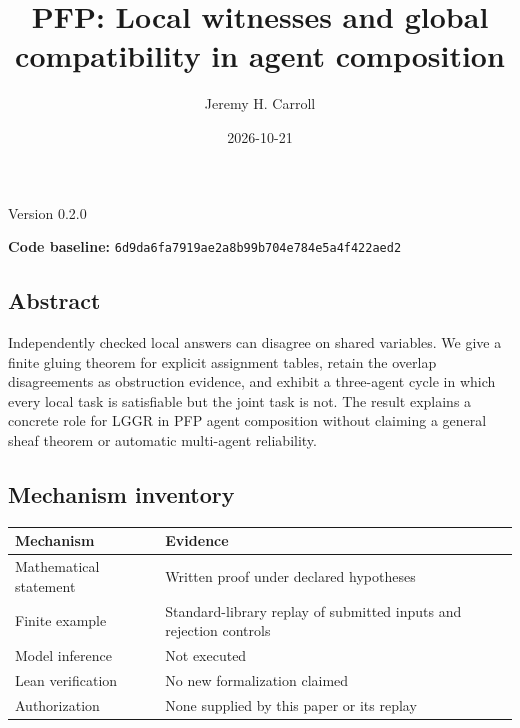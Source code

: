 \documentclass[
  11pt,
]{article}
\title{PFP: Local witnesses and global compatibility in agent
composition}
\author{Jeremy H. Carroll}
\date{2026-10-21}
\begin{document}
\makeatletter
\begin{center}
{\LARGE \@title\par}
\vspace{0.8em}
{\normalsize \@author\par}
\vspace{0.5em}
{\small \@date\par}
{\small Version 0.2.0\par}
\end{center}
\makeatother

\textbf{Code baseline:}
\nolinkurl{6d9da6fa7919ae2a8b99b704e784e5a4f422aed2}

\subsection{Abstract}\label{abstract}

Independently checked local answers can disagree on shared variables. We
give a finite gluing theorem for explicit assignment tables, retain the
overlap disagreements as obstruction evidence, and exhibit a three-agent
cycle in which every local task is satisfiable but the joint task is
not. The result explains a concrete role for LGGR in PFP agent
composition without claiming a general sheaf theorem or automatic
multi-agent reliability.

\subsection{Mechanism inventory}\label{mechanism-inventory}

\begin{longtable}[]{@{}
  >{\raggedright\arraybackslash}p{}
  >{\raggedright\arraybackslash}p{}@{}}
\toprule\noalign{}
\begin{minipage}[b]{\linewidth}\raggedright
Mechanism
\end{minipage} & \begin{minipage}[b]{\linewidth}\raggedright
Evidence
\end{minipage} \\
\midrule\noalign{}
\endhead
\bottomrule\noalign{}
\endlastfoot
Mathematical statement & Written proof under declared hypotheses \\
Finite example & Standard-library replay of submitted inputs and
rejection controls \\
Model inference & Not executed \\
Lean verification & No new formalization claimed \\
Authorization & None supplied by this paper or its replay \\
\end{longtable}
\end{document}
